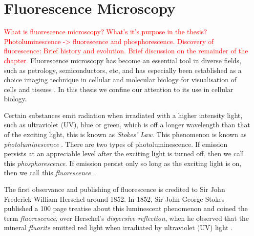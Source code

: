 
\chapter{Fluorescence Microscopy} %

\label{chap:Chapter2} %

\citep{Nobel2016}
\citep{Biehlmaier2013}
\citep{Svoboda2007}
\citep{Svoboda2009}
\citep{WuMerchantCastleman2008}
\citep{GonzalezWoods2002}
\citep{Pratt2001}
\citep{Soile2004}
\citep{Matula2006}
\citep{Rohr2010}
\citep{Matula2000}
\citep{Vu2008}
\citep{Kolmogorov2004}
\citep{Kozubek2001}
\citep{Petran1985}

\textcolor{red}{What is fluorescence microscopy? What's it's purpose in the thesis?	Photoluminescence -> fluorescence and phosphorescence. Discovery of fluorescence: Brief history and evolution. Brief discussion on the remainder of the chapter.}
Fluorescence microscopy has become an essential tool in diverse fields, such as petrology, semiconductors, etc, and has especially been established as a choice imaging technique in cellular and molecular biology for visualisation of cells and tissues \citep{Spring2003,Danek2012,Hubeny2008,Fatima2008,Matula2012}.
In this thesis we confine our attention to its use in cellular biology.

Certain substances emit radiation when irradiated with a higher intensity light, such as ultraviolet (UV), blue or green, which is off a longer wavelength than that of the exciting light, this is known as \textit{Stokes' Law}.
This phenomenon is known as \textit{photoluminescence} \citep{Koch1972,Vaughan2015,Sarder2006,AbramowitzDavidson2016}.
There are two types of photoluminescence. If emission persists at an appreciable level after the exciting light is turned off, then we call this \textit{phosphorescence}.
If emission persist only so long as the exciting light is on, then we call this \textit{fluorescence} \citep{Koch1972,SpringDavisdson2016}.

The first observance and publishing of fluorescence is credited to Sir John Frederick William Herschel around 1852.
In 1852, Sir John George Stokes published a 100 page treatise about this luminescent phenomenon and coined the term \textit{fluorescence}, over Herschel's \textit{dispersive reflection}, when he observed that the mineral \textit{fluorite} emitted red light when irradiated by ultraviolet (UV) light \citep{Dobrucki2013,Danek2012}.

